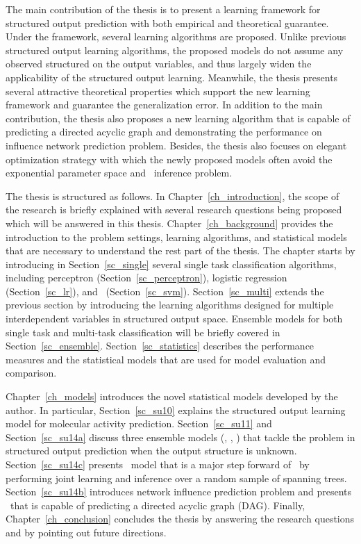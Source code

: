The main contribution of the thesis is to present a learning framework for structured output prediction with both empirical and theoretical guarantee.
Under the framework, several learning algorithms are proposed.
Unlike previous structured output learning algorithms, the proposed models do not assume any observed structured on the output variables, and thus largely widen the applicability of the structured output learning.
Meanwhile, the thesis presents several attractive theoretical properties which support the new learning framework and guarantee the generalization error.
In addition to the main contribution, the thesis also proposes a new learning algorithm that is capable of predicting a directed acyclic graph and demonstrating the performance on influence network prediction problem.
Besides, the thesis also focuses on elegant optimization strategy with which the newly proposed models often avoid the exponential parameter space and \nphard\ inference problem.

The thesis is structured as follows.
In Chapter~\ref{ch_introduction}, the scope of the research is briefly explained with several research questions being proposed which will be answered in this thesis.
Chapter~\ref{ch_background} provides the introduction to the problem settings, learning algorithms, and statistical models that are necessary to understand the rest part of the thesis.
The chapter starts by introducing in Section~\ref{sc_single} several single task classification algorithms, including 
perceptron (Section~\ref{sc_perceptron}), 
logistic regression (Section~\ref{sc_lr}), 
and \svm\ (Section~\ref{sc_svm}).
Section~\ref{sc_multi} extends the previous section by introducing the learning algorithms designed for multiple interdependent variables in structured output space.
Ensemble models for both single task and multi-task classification will be briefly covered in Section~\ref{sc_ensemble}.
Section~\ref{sc_statistics} describes the performance measures and the statistical models that are used for model evaluation and comparison.

Chapter~\ref{ch_models} introduces the novel statistical models developed by the author.
In particular, Section~\ref{sc_su10} explains the structured output learning model for molecular activity prediction.
Section~\ref{sc_su11} and Section~\ref{sc_su14a} discuss three ensemble models (\mve, \amm, \mam) that tackle the problem in structured output prediction when the output structure is unknown.
Section~\ref{sc_su14c} presents \rta\ model that is a major step forward of \mam\ by performing joint learning and inference over a random sample of spanning trees.
Section~\ref{sc_su14b} introduces network influence prediction problem and presents \spin\ that is capable of predicting a directed acyclic graph (DAG).
Finally, Chapter~\ref{ch_conclusion} concludes the thesis by answering the research questions and by pointing out future directions.

